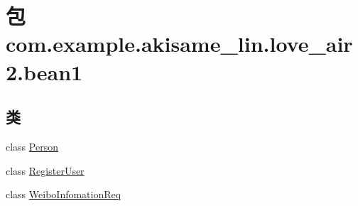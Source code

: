 \hypertarget{namespacecom_1_1example_1_1akisame__lin_1_1love__air2_1_1bean1}{}\section{包 com.\+example.\+akisame\+\_\+lin.\+love\+\_\+air2.\+bean1}
\label{namespacecom_1_1example_1_1akisame__lin_1_1love__air2_1_1bean1}
\subsection*{类}
\begin{DoxyCompactItemize}
\item 
class \mbox{\hyperlink{classcom_1_1example_1_1akisame__lin_1_1love__air2_1_1bean1_1_1_person}{Person}}
\item 
class \mbox{\hyperlink{classcom_1_1example_1_1akisame__lin_1_1love__air2_1_1bean1_1_1_register_user}{Register\+User}}
\item 
class \mbox{\hyperlink{classcom_1_1example_1_1akisame__lin_1_1love__air2_1_1bean1_1_1_weibo_infomation_req}{Weibo\+Infomation\+Req}}
\end{DoxyCompactItemize}

